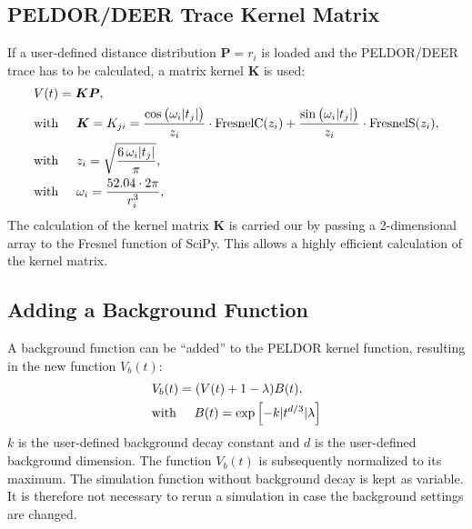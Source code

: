 \documentclass[pdftex,bezier,german,a4,twoside, headexclude,12pt,nochapterprefix, titlepage]{extarticle}
\begin{document}
\subsection{PELDOR/DEER Trace Kernel Matrix}
If a user-defined distance distribution $\boldsymbol{P} = r_{i}$ is loaded and the PELDOR/DEER trace has to be calculated, a 
matrix kernel $\boldsymbol{K}$ is used:
\begin{align}
\begin{split}
&V(t) = \boldsymbol{K}\boldsymbol{P},\\
&\mbox{with}\hspace{0.5cm} \boldsymbol{K} = K_{ji} =
\frac{\cos{\big(\omega_{i}|t_j| \big)}}{z_{i}} \cdot \text{FresnelC}(z_{i})  + 
   \frac{\sin{\big(\omega_{i} |t_j|\big)}}{z_{i}} \cdot \text{FresnelS}(z_{i}),\\
  &\mbox{with}\hspace{0.5cm}  z_{i} = \sqrt{\frac{6\,\omega_{i} |t_j| }{\pi}},\\
&\mbox{with}\hspace{0.5cm} \omega_{i} = \dfrac{52.04\cdot 2 \pi}{r_{i}^3},\\ 
\label{kernel_matrix_cal}
\end{split}
\end{align}
The calculation of the kernel matrix $\boldsymbol{K}$ is carried our by passing a 2-dimensional array to the Fresnel function of SciPy. This allows a highly efficient calculation of the kernel matrix.
\subsection{Adding a Background Function}
A background function can be ``added'' to the PELDOR kernel function, resulting in the new function $V_{b}(t)$: 
\begin{align}
\begin{split}
&V_{b}(t) = (V(t)+1-\lambda)B(t), \\
&\mbox{with}\hspace{0.5cm}B(t) = \mathrm{exp}\left[-k|t^{d/3}|\lambda \right]
\label{background_function}
\end{split}
\end{align}
$k$ is the user-defined background decay constant and $d$ is the user-defined background dimension. The 
function $V_{b}(t)$ is subsequently normalized to its maximum.
The simulation function without background decay is kept as variable. It is therefore not necessary to rerun a simulation in 
case the background settings are changed.
\end{document}
